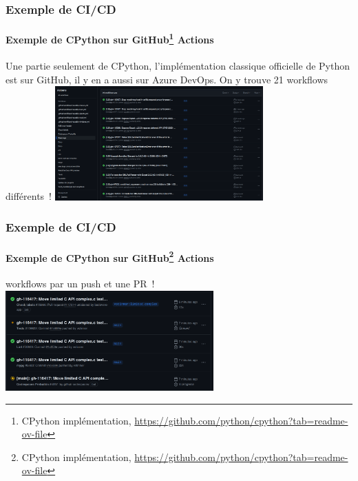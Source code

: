 \documentclass{beamer}
\begin{document}
    \begin{frame}
        \frametitle{Exemple de CI/CD}
        \framesubtitle{Exemple de CPython sur GitHub{\footnote{CPython implémentation, \url{https://github.com/python/cpython?tab=readme-ov-file}}} Actions}
        \transdissolve
        Une partie seulement de CPython, l'implémentation classique officielle de Python est sur GitHub, il y en a aussi sur Azure DevOps.
        On y trouve 21 workflows différents~!
        \bigbreak
        \centering
        \includegraphics[width=8cm]{image/cpython-github-workflows}
    \end{frame}

    \begin{frame}
        \frametitle{Exemple de CI/CD}
        \framesubtitle{Exemple de CPython sur GitHub{\footnote{CPython implémentation, \url{https://github.com/python/cpython?tab=readme-ov-file}}} Actions}
         workflows  par un push et une PR~!
        \bigbreak
        \centering
        \includegraphics[width=8cm]{image/cpython-actions-triggered}
    \end{frame}
\end{document}
